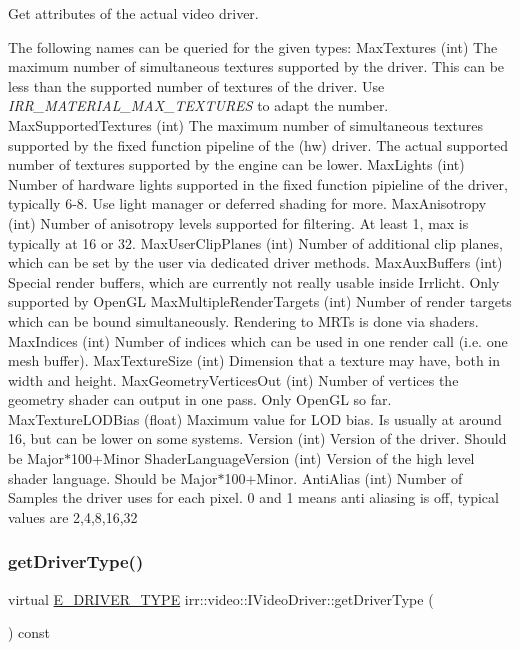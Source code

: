 Get attributes of the actual video driver. 

The following names can be queried for the given types\+: Max\+Textures (int) The maximum number of simultaneous textures supported by the driver. This can be less than the supported number of textures of the driver. Use {\itshape I\+R\+R\+\_\+\+M\+A\+T\+E\+R\+I\+A\+L\+\_\+\+M\+A\+X\+\_\+\+T\+E\+X\+T\+U\+R\+ES} to adapt the number. Max\+Supported\+Textures (int) The maximum number of simultaneous textures supported by the fixed function pipeline of the (hw) driver. The actual supported number of textures supported by the engine can be lower. Max\+Lights (int) Number of hardware lights supported in the fixed function pipieline of the driver, typically 6-\/8. Use light manager or deferred shading for more. Max\+Anisotropy (int) Number of anisotropy levels supported for filtering. At least 1, max is typically at 16 or 32. Max\+User\+Clip\+Planes (int) Number of additional clip planes, which can be set by the user via dedicated driver methods. Max\+Aux\+Buffers (int) Special render buffers, which are currently not really usable inside Irrlicht. Only supported by Open\+GL Max\+Multiple\+Render\+Targets (int) Number of render targets which can be bound simultaneously. Rendering to M\+R\+Ts is done via shaders. Max\+Indices (int) Number of indices which can be used in one render call (i.\+e. one mesh buffer). Max\+Texture\+Size (int) Dimension that a texture may have, both in width and height. Max\+Geometry\+Vertices\+Out (int) Number of vertices the geometry shader can output in one pass. Only Open\+GL so far. Max\+Texture\+L\+O\+D\+Bias (float) Maximum value for L\+OD bias. Is usually at around 16, but can be lower on some systems. Version (int) Version of the driver. Should be Major$\ast$100+\+Minor Shader\+Language\+Version (int) Version of the high level shader language. Should be Major$\ast$100+\+Minor. Anti\+Alias (int) Number of Samples the driver uses for each pixel. 0 and 1 means anti aliasing is off, typical values are 2,4,8,16,32 \mbox{\label{classirr_1_1video_1_1IVideoDriver_af89a0c4fcc0337f3befe8b90424e68aa}} 
\subsubsection{\texorpdfstring{get\+Driver\+Type()}{getDriverType()}\hspace{0.1cm}{\footnotesize\ttfamily [1/2]}}
{\footnotesize\ttfamily virtual \hyperlink{namespaceirr_1_1video_ae35a6de6d436c76107ad157fe42356d0}{E\+\_\+\+D\+R\+I\+V\+E\+R\+\_\+\+T\+Y\+PE} irr\+::video\+::\+I\+Video\+Driver\+::get\+Driver\+Type (\begin{DoxyParamCaption}{ }\end{DoxyParamCaption}) const\hspace{0.3cm}{\ttfamily [pure virtual]}}



